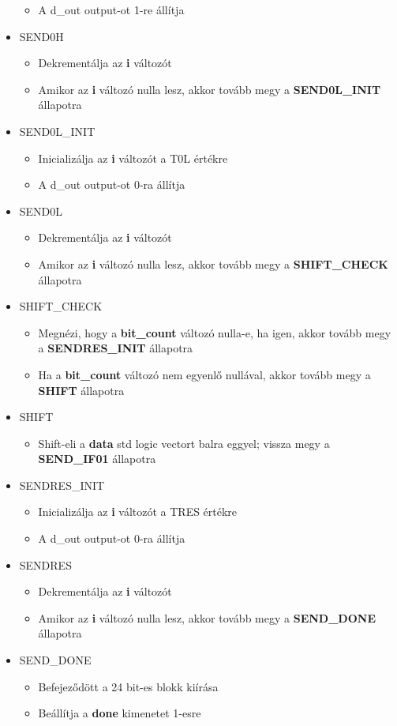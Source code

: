 \documentclass[10pt]{article} %
\begin{document}
\begin{itemize}
\begin{itemize}
	\item A d\_out output-ot 1-re állítja
	\end{itemize}
\item SEND0H
	\begin{itemize}
	\item Dekrementálja az \textbf{i} változót
	\item Amikor az \textbf{i} változó nulla lesz, akkor tovább megy a \textbf{SEND0L\_INIT} állapotra
	\end{itemize}
\item SEND0L\_INIT
	\begin{itemize}
	\item Inicializálja az \textbf{i} változót a T0L értékre
	\item A d\_out output-ot 0-ra állítja
	\end{itemize}
\item SEND0L
	\begin{itemize}
	\item Dekrementálja az \textbf{i} változót
	\item Amikor az \textbf{i} változó nulla lesz, akkor tovább megy a \textbf{SHIFT\_CHECK} állapotra
	\end{itemize}
\item SHIFT\_CHECK
	\begin{itemize}
	\item Megnézi, hogy a \textbf{bit\_count} változó nulla-e, ha igen, akkor tovább megy a \textbf{SENDRES\_INIT} állapotra
	\item Ha a \textbf{bit\_count} változó nem egyenlő nullával, akkor tovább megy a \textbf{SHIFT} állapotra
	\end{itemize}
\item SHIFT
	\begin{itemize}
	\item Shift-eli a \textbf{data} std logic vectort balra eggyel; vissza megy a \textbf{SEND\_IF01} állapotra
	\end{itemize}
\item SENDRES\_INIT
	\begin{itemize}
	\item Inicializálja az \textbf{i} változót a TRES értékre
	\item A d\_out output-ot 0-ra állítja
	\end{itemize}
\item SENDRES
	\begin{itemize}
	\item Dekrementálja az \textbf{i} változót
	\item Amikor az \textbf{i} változó nulla lesz, akkor tovább megy a \textbf{SEND\_DONE} állapotra
	\end{itemize}
\item SEND\_DONE
	\begin{itemize}
	\item Befejeződött a 24 bit-es blokk kiírása
	\item Beállítja a \textbf{done} kimenetet 1-esre
	\end{itemize}
\end{itemize}
\end{document}
